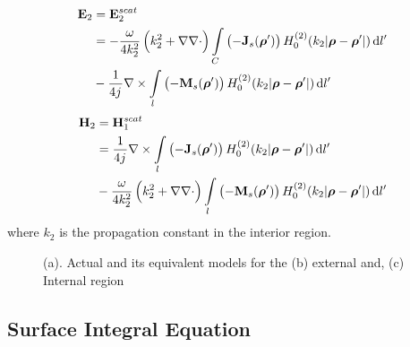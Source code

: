 \documentclass[12pt]{article}
\begin{document}
%
\begin{equation}
  \begin{split}
    \mathbf{E}_2 &= \mathbf{E}_2^{scat} \\
    &=  -\frac{\omega}{4 k_2^2} \left( k_2^2 + \nabla \nabla \cdot \right) \int\limits_{C} \left(-\mathbf{J}_s(\boldsymbol {\rho}')\right) H_0^{(2)}(k_2 |\boldsymbol {\rho} - \boldsymbol {\rho}'|) \mathop{}\!\mathrm{d}{l'} \\
    &- \frac{1}{4 {j}\mkern1mu} \nabla \times \int\limits_{l} \left(-\mathbf{M}_s(\boldsymbol {\rho}')\right) H_0^{(2)}(k_2 |\boldsymbol {\rho} - \boldsymbol {\rho}'|) \mathop{}\!\mathrm{d}{l'}
  \end{split}
  \label{eq:E2scatt}
\end{equation}
%
\begin{equation}
  \begin{split}
    \mathbf{H}_2 &= \mathbf{H}_1^{scat} \\
    &= \frac{1}{4 {j}\mkern1mu} \nabla \times \int\limits_{l} \left(-\mathbf{J}_s(\boldsymbol {\rho}')\right) H_0^{(2)}(k_2 |\boldsymbol {\rho} - \boldsymbol {\rho}'|) \mathop{}\!\mathrm{d}{l'} \\
    &-\frac{\omega}{4 k_2^2} \left( k_2^2 + \nabla \nabla \cdot \right) \int\limits_{l} \left(-\mathbf{M}_s(\boldsymbol {\rho}')\right) H_0^{(2)}(k_2 |\boldsymbol {\rho} - \boldsymbol {\rho}'|) \mathop{}\!\mathrm{d}{l'}
  \end{split}
  \label{eq:H2scatt}
\end{equation}
%
where $k_2$ is the propagation constant in the interior region.
%
\begin{figure}[b!]
  \centering
  \def\svgwidth{1\linewidth}
  
  \caption{(a). Actual and its equivalent models for the (b) external and, (c) Internal region}
  \label{fig:surfeq}
\end{figure}

\subsection{Surface Integral Equation}
%
\end{document}
